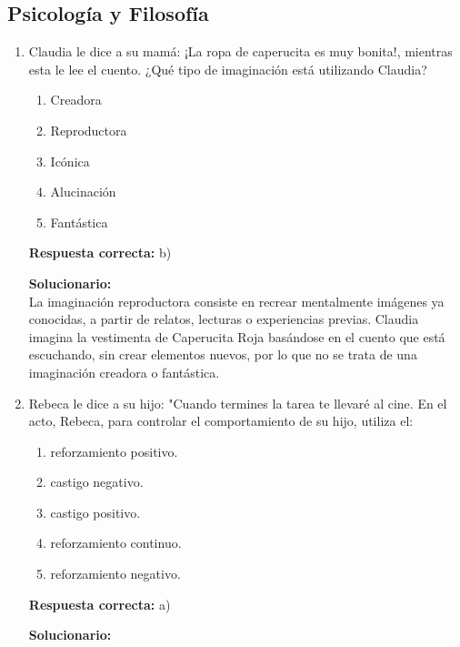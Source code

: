 \subsection*{Psicología y Filosofía}

\begin{enumerate}
	
	\item Claudia le dice a su mamá: ¡La ropa de caperucita es muy bonita!, mientras esta le lee el cuento.
	¿Qué tipo de imaginación está utilizando Claudia?
	
	\begin{enumerate}[label=\alph*)]
		\item Creadora
		\item Reproductora
		\item Icónica
		\item Alucinación
		\item Fantástica
	\end{enumerate}
	
	\textbf{Respuesta correcta:} b)
	
      \vspace{2mm}
      \textbf{Solucionario:}\\
      
      La imaginación reproductora consiste en recrear mentalmente imágenes ya conocidas, a partir de relatos, lecturas o experiencias previas.
      Claudia imagina la vestimenta de Caperucita Roja basándose en el cuento que está escuchando, sin crear elementos nuevos, por lo que no se trata de una imaginación creadora o fantástica.
	
	\vspace{6mm}
	
	\item Rebeca le dice a su hijo: "Cuando termines la tarea te llevaré al cine. En el acto, Rebeca, para controlar el comportamiento de su hijo, utiliza el:
	\begin{enumerate}[label=\alph*)]
		\item reforzamiento positivo.
		\item castigo negativo.
		\item castigo positivo.
		\item reforzamiento continuo.
		\item reforzamiento negativo.
	\end{enumerate}
	
	\textbf{Respuesta correcta:} a)
	

	\vspace{2mm}
	\textbf{Solucionario:}\\
	

\end{enumerate}
